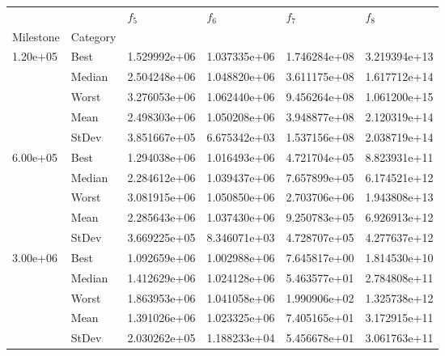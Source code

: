 \begin{tabular}{llllll}
\toprule
         &      &      $f_{5}$ &      $f_{6}$ &      $f_{7}$ &      $f_{8}$ \\
Milestone & Category &              &              &              &              \\
\midrule
\multirow{5}{*}{1.20e+05} & Best & 1.529992e+06 & 1.037335e+06 & 1.746284e+08 & 3.219394e+13 \\
         & Median & 2.504248e+06 & 1.048820e+06 & 3.611175e+08 & 1.617712e+14 \\
         & Worst & 3.276053e+06 & 1.062440e+06 & 9.456264e+08 & 1.061200e+15 \\
         & Mean & 2.498303e+06 & 1.050208e+06 & 3.948877e+08 & 2.120319e+14 \\
         & StDev & 3.851667e+05 & 6.675342e+03 & 1.537156e+08 & 2.038719e+14 \\
\cline{1-6}
\multirow{5}{*}{6.00e+05} & Best & 1.294038e+06 & 1.016493e+06 & 4.721704e+05 & 8.823931e+11 \\
         & Median & 2.284612e+06 & 1.039437e+06 & 7.657899e+05 & 6.174521e+12 \\
         & Worst & 3.081915e+06 & 1.050850e+06 & 2.703706e+06 & 1.943808e+13 \\
         & Mean & 2.285643e+06 & 1.037430e+06 & 9.250783e+05 & 6.926913e+12 \\
         & StDev & 3.669225e+05 & 8.346071e+03 & 4.728707e+05 & 4.277637e+12 \\
\cline{1-6}
\multirow{5}{*}{3.00e+06} & Best & 1.092659e+06 & 1.002988e+06 & 7.645817e+00 & 1.814530e+10 \\
         & Median & 1.412629e+06 & 1.024128e+06 & 5.463577e+01 & 2.784808e+11 \\
         & Worst & 1.863953e+06 & 1.041058e+06 & 1.990906e+02 & 1.325738e+12 \\
         & Mean & 1.391026e+06 & 1.023325e+06 & 7.405165e+01 & 3.172915e+11 \\
         & StDev & 2.030262e+05 & 1.188233e+04 & 5.456678e+01 & 3.061763e+11 \\
\bottomrule
\end{tabular}
